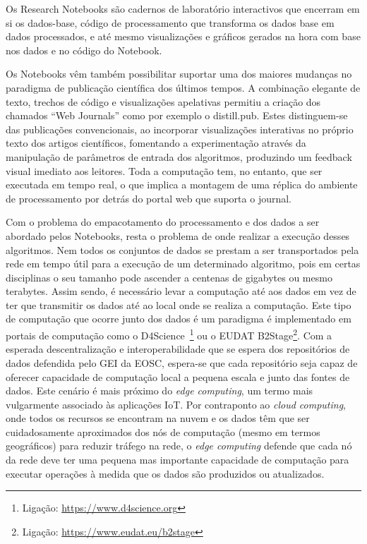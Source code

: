 \documentclass[sigconf,nonacm]{acmart}
\begin{document}
Os Research Notebooks são cadernos de laboratório interactivos que encerram em si os dados-base, código de processamento que transforma os dados base em dados processados, e até mesmo visualizações e gráficos gerados na hora com base nos dados e no código do Notebook.

Os Notebooks vêm também possibilitar suportar uma dos maiores mudanças no paradigma de publicação científica dos últimos tempos. A combinação elegante de texto, trechos de código e visualizações apelativas permitiu a criação dos chamados ``Web Journals'' como por exemplo o distill.pub. Estes distinguem-se das publicações convencionais, ao incorporar visualizações interativas no próprio texto dos artigos científicos, fomentando a experimentação através da manipulação de parâmetros de entrada dos algoritmos, produzindo um feedback visual imediato aos leitores. Toda a computação tem, no entanto, que ser executada em tempo real, o que implica a montagem de uma réplica do ambiente de processamento por detrás do portal web que suporta o journal.

Com o problema do empacotamento do processamento e dos dados a ser abordado pelos Notebooks, resta o problema de onde realizar a execução desses algoritmos. Nem todos os conjuntos de dados se prestam a ser transportados pela rede em tempo útil para a execução de um determinado algoritmo, pois em certas disciplinas o seu tamanho pode ascender a centenas de gigabytes ou mesmo terabytes. Assim sendo, é necessário levar a computação até aos dados em vez de ter que transmitir os dados até ao local onde se realiza a computação. Este tipo de computação que ocorre junto dos dados é um paradigma é implementado em portais de computação como o D4Science~\footnote{Ligação: \url{https://www.d4science.org}} ou o EUDAT B2Stage\footnote{Ligação: \url{https://www.eudat.eu/b2stage}}. Com a esperada descentralização e interoperabilidade que se espera dos repositórios de dados defendida pelo GEI da EOSC, espera-se que cada repositório seja capaz de oferecer capacidade de computação local a pequena escala e junto das fontes de dados. Este cenário é mais próximo do \emph{edge computing}, um termo mais vulgarmente associado às aplicações IoT. Por contraponto ao \emph{cloud computing}, onde todos os recursos se encontram na nuvem e os dados têm que ser cuidadosamente aproximados dos nós de computação (mesmo em termos geográficos) para reduzir tráfego na rede, o \emph{edge computing} defende que cada nó da rede deve ter uma pequena mas importante capacidade de computação para executar operações à medida que os dados são produzidos ou atualizados. 
\end{document}

